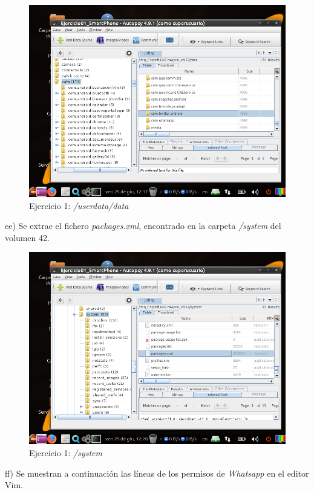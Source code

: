 \documentclass[11pt]{article}
\begin{document}
\begin{figure}[H]
    \caption{Ejercicio 1: \textit{/userdata/data}}
    \centering
    \includegraphics[scale=0.7]{e1-29.png}
\end{figure}

ee) Se extrae el fichero \textit{packages.xml}, encontrado en la carpeta \textit{/system} del volumen 42.

\begin{figure}[H]
    \caption{Ejercicio 1: \textit{/system}}
    \centering
    \includegraphics[scale=0.7]{e1-30.png}
\end{figure}

ff) Se muestran a continuación las líneas de los permisos de \textit{Whatsapp} en el editor Vim.
\end{document}
